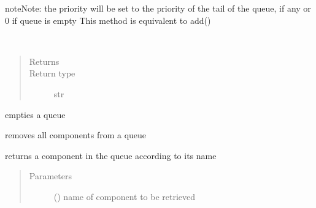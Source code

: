 \documentclass[letterpaper,10pt,english]{sphinxmanual}
\begin{document}
\begin{fulllineitems}
\begin{fulllineitems}
\begin{quote}
\begin{description}
\end{description}\end{quote}

\begin{sphinxadmonition}{note}{Note:}
the priority will be set to
the priority of the tail of the queue, if any
or 0 if queue is empty 
This method is equivalent to add()
\end{sphinxadmonition}

\end{fulllineitems}


\begin{fulllineitems}
\label{\detokenize{Reference:salabim.Queue.base_name}}~\begin{quote}\begin{description}
\item[{Returns}] \leavevmode
{}

\item[{Return type}] \leavevmode
str

\end{description}\end{quote}

\end{fulllineitems}


\begin{fulllineitems}
\label{\detokenize{Reference:salabim.Queue.clear}}
empties a queue

removes all components from a queue

\end{fulllineitems}


\begin{fulllineitems}
\label{\detokenize{Reference:salabim.Queue.component_with_name}}
returns a component in the queue according to its name
\begin{quote}\begin{description}
\item[{Parameters}] \leavevmode
{} () \textendash{} name of component to be retrieved


\end{description}
\end{quote}
\end{fulllineitems}
\end{fulllineitems}
\end{document}
